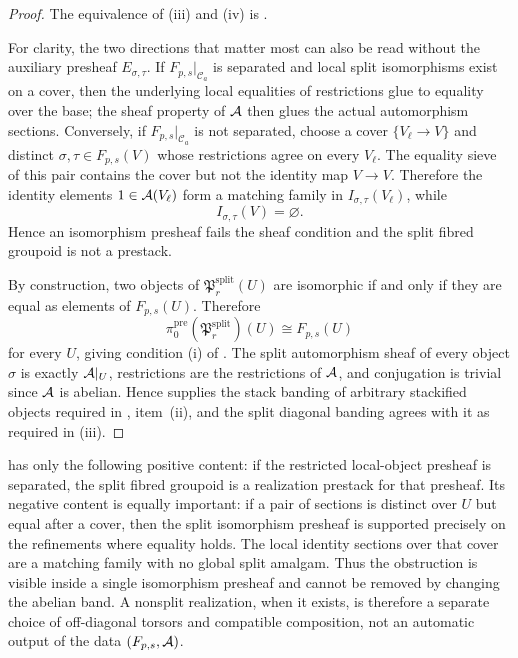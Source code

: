 \begin{proof}
The equivalence of \textup{(iii)} and \textup{(iv)} is .

For clarity, the two directions that matter most can also be read without the auxiliary presheaf $E_{\sigma,\tau}$. If $F_{p,s}|_{\mathcal C_a}$ is separated and local split isomorphisms exist on a cover, then the underlying local equalities of restrictions glue to equality over the base; the sheaf property of $\mathcal{A}$ then glues the actual automorphism sections. Conversely, if $F_{p,s}|_{\mathcal C_a}$ is not separated, choose a cover $\{V_\ell\to V\}$ and distinct $\sigma,\tau\in F_{p,s}(V)$ whose restrictions agree on every $V_\ell$. The equality sieve of this pair contains the cover but not the identity map $V\to V$. Therefore the identity elements $1\in\mathcal{A}(V_\ell)$ form a matching family in $I_{\sigma,\tau}(V_\ell)$, while
\[
I_{\sigma,\tau}(V)=\varnothing.
\]
Hence an isomorphism presheaf fails the sheaf condition and the split fibred groupoid is not a prestack.

By construction, two objects of $\mathfrak P_r^{\mathrm{split}}(U)$ are isomorphic if and only if they are equal as elements of $F_{p,s}(U)$. Therefore
\[
\pi_0^{\mathrm{pre}}(\mathfrak P_r^{\mathrm{split}})(U)\cong F_{p,s}(U)
\]
for every $U$, giving condition \textup{(i)} of . The split automorphism sheaf of every object $\sigma$ is exactly $\mathcal{A}|_U$, restrictions are the restrictions of $\mathcal{A}$, and conjugation is trivial since $\mathcal{A}$ is abelian. Hence  supplies the stack banding of arbitrary stackified objects required in , item~\textup{(ii)}, and the split diagonal banding agrees with it as required in \textup{(iii)}.
\end{proof}

\begin{remark}\label{rem:split-criterion-reading}
 has only the following positive content:
if the restricted local-object presheaf is separated, the split fibred groupoid
is a realization prestack for that presheaf. Its negative content is equally
important: if a pair of sections is distinct over $U$ but equal after a cover,
then the split isomorphism presheaf is supported precisely on the refinements
where equality holds. The local identity sections over that cover are a
matching family with no global split amalgam. Thus the obstruction is visible
inside a single isomorphism presheaf and cannot be removed by changing the
abelian band. A nonsplit realization, when it exists, is therefore a separate
choice of off-diagonal torsors and compatible composition, not an automatic
output of the data $(F_{p,s},\mathcal{A})$.
\end{remark}

